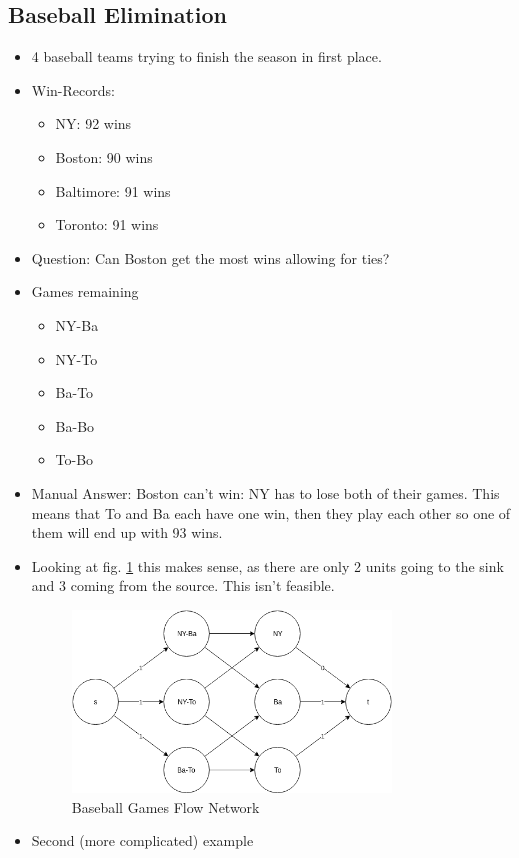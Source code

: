 \documentclass[12pt, letter]{article}
\begin{document}
\subsection*{Baseball Elimination}
\begin{itemize}
	\item 4 baseball teams trying to finish the season in first place.
	\item Win-Records:
	\begin{itemize}
		\item NY: 92 wins
		\item Boston: 90 wins
		\item Baltimore: 91 wins
		\item Toronto: 91 wins
	\end{itemize}
	\item Question: Can Boston get the most wins allowing for ties?
	\item Games remaining
	\begin{itemize}
		\item NY-Ba
		\item NY-To
		\item Ba-To
		\item Ba-Bo
		\item To-Bo
	\end{itemize}
	\item Manual Answer: Boston can't win: NY has to lose both of their games. This means that To and Ba each have one win, then they play each other so one of them will end up with 93 wins.
	\item Looking at fig. \ref{fig:bb} this makes sense, as there are only 2 units going to the sink and 3 coming from the source. This isn't feasible.
	\begin{figure}[h]
		\centering
		\includegraphics[width=0.8\textwidth]{bb}
		\caption{Baseball Games Flow Network}
		\label{fig:bb}
	\end{figure}
	\item Second (more complicated) example

\end{itemize}
\end{document}
